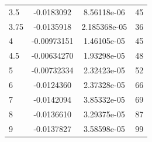 \documentclass[twoside, 10pt]{article}
\begin{document}
\begin{multicols}{2}
\begin{center}
\begin{tabular}{ | l | c | c | c | }
3.5 & -0.0183092 & 8.56118e-06 & 45 \\
3.75 & -0.0135918 & 2.185368e-05 & 36 \\
4 & -0.00973151 & 1.46105e-05 & 45 \\
4.5 & -0.00634270 & 1.93298e-05 & 48 \\
5 & -0.00732334 & 2.32423e-05 & 52 \\
6 & -0.0124360 & 2.37328e-05 & 66 \\



7 & -0.0142094 & 3.85332e-05 & 69 \\
8 & -0.0136610 & 3.29375e-05 & 87 \\
9 & -0.0137827 & 3.58598e-05 & 99 \\
\hline
\end{tabular}
\end{center}






\end{multicols}
\end{document}
